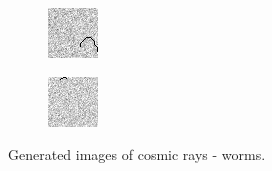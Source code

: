 \begin{figure}[!h]
\begin{subfigure}[t]{.23\textwidth}
    \end{subfigure}
    \begin{subfigure}[t]{.23\textwidth}
        \centering
        \includegraphics[width=\textwidth]{images/wormC.png}
    \end{subfigure}
    \begin{subfigure}[t]{.23\textwidth}
        \centering
        \includegraphics[width=\textwidth]{images/wormD.png}
    \end{subfigure}

    \caption{Generated images of cosmic rays - worms. }
    \label{fig:wormspar}
\end{figure}

